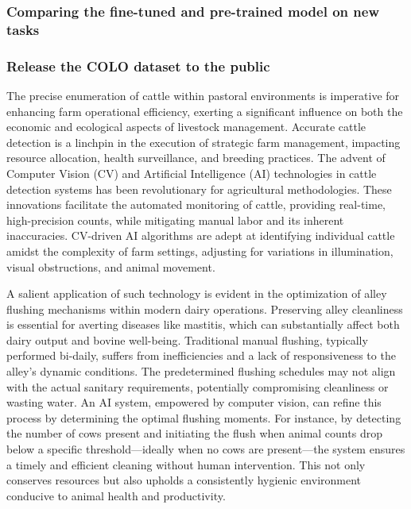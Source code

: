 \subsubsection*{Comparing the fine-tuned and pre-trained model on new tasks}

\subsubsection*{Release the COLO dataset to the public}




The precise enumeration of cattle within pastoral environments is imperative for enhancing farm operational efficiency, exerting a significant influence on both the economic and ecological aspects of livestock management. Accurate cattle detection is a linchpin in the execution of strategic farm management, impacting resource allocation, health surveillance, and breeding practices. The advent of Computer Vision (CV) and Artificial Intelligence (AI) technologies in cattle detection systems has been revolutionary for agricultural methodologies. These innovations facilitate the automated monitoring of cattle, providing real-time, high-precision counts, while mitigating manual labor and its inherent inaccuracies. CV-driven AI algorithms are adept at identifying individual cattle amidst the complexity of farm settings, adjusting for variations in illumination, visual obstructions, and animal movement.

A salient application of such technology is evident in the optimization of alley flushing mechanisms within modern dairy operations. Preserving alley cleanliness is essential for averting diseases like mastitis, which can substantially affect both dairy output and bovine well-being. Traditional manual flushing, typically performed bi-daily, suffers from inefficiencies and a lack of responsiveness to the alley's dynamic conditions. The predetermined flushing schedules may not align with the actual sanitary requirements, potentially compromising cleanliness or wasting water. An AI system, empowered by computer vision, can refine this process by determining the optimal flushing moments. For instance, by detecting the number of cows present and initiating the flush when animal counts drop below a specific threshold—ideally when no cows are present—the system ensures a timely and efficient cleaning without human intervention. This not only conserves resources but also upholds a consistently hygienic environment conducive to animal health and productivity.

